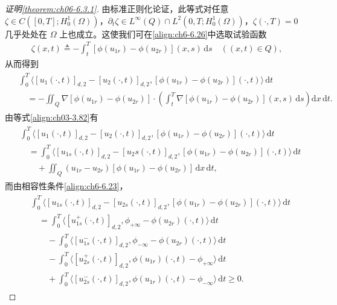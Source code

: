 \documentclass[../../main.tex]{subfiles}%
\begin{document}
\begin{proof}[证明\cref{theorem:ch06-6.3.1}]
由标准正则化论证，此等式对任意 $\zeta\in C([0,T];H^1_0(\Omega))$，$\partial_t\zeta\in L^\infty(Q)\cap L^2(0,T;H^1_0(\Omega))$，$\zeta(\cdot,T)=0$ 几乎处处在 $\Omega$ 上也成立。这使我们可在\eqref{align:ch6-6.26}中选取试验函数
\begin{align*}
\zeta(x,t)\triangleq -\int_t^T[\phi(u_{1r})-\phi(u_{2r})](x,s)\,\mathrm{d}s \quad((x,t)\in Q),
\end{align*}
从而得到
\begin{align}
\begin{aligned}
&\int_0^T\langle[u_1(\cdot,t)]_{d,2}-[u_2(\cdot,t)]_{d,2},
[\phi(u_{1r})-\phi(u_{2r})](\cdot,t)\rangle\,\mathrm{d}t\\
&\quad= -\iint_Q\nabla[\phi(u_{1r})-\phi(u_{2r})]\cdot
\left(\int_t^T\nabla[\phi(u_{1r})-\phi(u_{2r})](x,s)\,\mathrm{d}s\right)\mathrm{d}x\,\mathrm{d}t.
\end{aligned} \label{align:ch6-6.27}
\end{align}
由等式\eqref{align:ch03-3.82}有
\begin{align}
\begin{aligned}
&\int_0^T\langle[u_1(\cdot,t)]_{d,2}-[u_2(\cdot,t)]_{d,2},
[\phi(u_{1r})-\phi(u_{2r})](\cdot,t)\rangle\,\mathrm{d}t\\
&\quad= \int_0^T\langle[u_{1s}(\cdot,t)]_{d,2}-[u_2s(\cdot,t)]_{d,2},
[\phi(u_{1r})-\phi(u_{2r})](\cdot,t)\rangle\,\mathrm{d}t\\
&\qquad+\iint_Q(u_{1r}-u_{2r})[\phi(u_{1r})-\phi(u_{2r})]\,\mathrm{d}x\,\mathrm{d}t,
\end{aligned} \label{align:ch6-6.28}
\end{align}
而由相容性条件\eqref{align:ch6-6.23}，
\begin{align}
\begin{aligned}
&\int_0^T\langle[u_{1s}(\cdot,t)]_{d,2}-[u_{2s}(\cdot,t)]_{d,2},
[\phi(u_{1r})-\phi(u_{2r})](\cdot,t)\rangle\,\mathrm{d}t\\
&\quad= \int_0^T\langle[u^+_{1s}(\cdot,t)]_{d,2},\phi_{+\infty}-\phi(u_{2r})(\cdot,t)\rangle\,\mathrm{d}t\\
&\qquad-\int_0^T\langle[u^-_{1s}(\cdot,t)]_{d,2},\phi_{-\infty}-\phi(u_{2r})(\cdot,t)\rangle\,\mathrm{d}t\\
&\qquad-\int_0^T\langle[u^+_{2s}(\cdot,t)]_{d,2},\phi(u_{1r})(\cdot,t)-\phi_{+\infty}\rangle\,\mathrm{d}t\\
&\qquad+\int_0^T\langle[u^-_{2s}(\cdot,t)]_{d,2},\phi(u_{1r})(\cdot,t)-\phi_{-\infty}\rangle\,\mathrm{d}t
\geqslant0.
\end{aligned} \label{align:ch6-6.29}

\end{align}
\end{proof}
\end{document}
